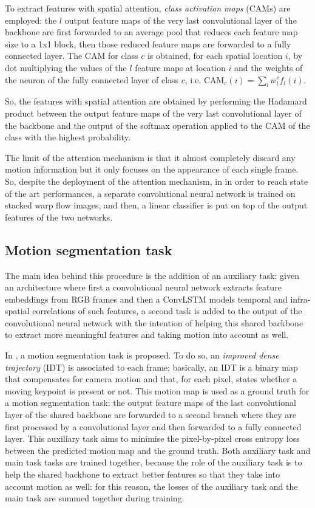 \documentclass[10pt,twocolumn,letterpaper]{article}
\begin{document}
To extract features with spatial attention, \textit{class activation maps} (CAMs) are employed: the $l$ output feature maps of the very last convolutional layer of the backbone are first forwarded to an average pool that reduces each feature map size to a 1x1 block, then those reduced feature maps are forwarded to a fully connected layer. The CAM for class $c$ is obtained, for each spatial location $i$, by dot multiplying the values of the $l$ feature maps at location $i$ and the weights of the neuron of the fully connected layer of class $c$, i.e. ${\text{CAM}_c(i) = \sum_l w_l^c f_l(i)}$. 

So, the features with spatial attention are obtained by performing the Hadamard product between the output feature maps of the very last convolutional layer of the backbone and the output of the softmax operation applied to the CAM of the class with the highest probability.

The limit of the attention mechanism is that it almost completely discard any motion information but it only focuses on the appearance of each single frame. So, despite the deployment of the attention mechanism, in \cite{planamente2020joint} in order to reach state of the art performances, a separate convolutional neural network is trained on stacked warp flow images, and then, a linear classifier is put on top of the output features of the two networks.

\subsection{Motion segmentation task}
The main idea behind this procedure is the addition of an auxiliary task: given an architecture where first a convolutional neural network extracts feature embeddings from RGB frames and then a ConvLSTM models temporal and infra-spatial correlations of such features, a second task is added to the output of the convolutional neural network with the intention of helping this shared backbone to extract more meaningful features and taking motion into account as well.

In \cite{planamente2020joint}, a motion segmentation task is proposed. To do so, an \textit{improved dense trajectory} (IDT) is associated to each frame; basically, an IDT is a binary map that compensates for camera motion and that, for each pixel, states whether a moving keypoint is present or not. This motion map is used as a ground truth for a motion segmentation task: the output feature maps of the last convolutional layer of the shared backbone are forwarded to a second branch where they are first processed by a convolutional layer and then forwarded to a fully connected layer. This auxiliary task aims to minimise the pixel-by-pixel cross entropy loss between the predicted motion map and the ground truth. Both auxiliary task and main task tasks are trained together, because the role of the auxiliary task is to help the shared backbone to extract better features so that they take into account motion as well: for this reason, the losses of the auxiliary task and the main task are summed together during training.
\end{document}
